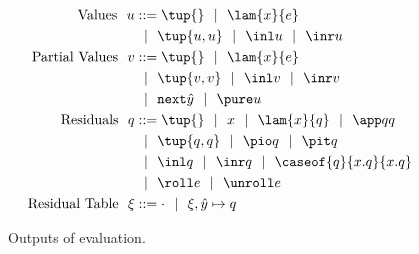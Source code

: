 
\begin{figure}
\begin{abstrsyn}
\[\begin{aligned}
\text{Values}\ \ 
u &::= \tup{}
 \gbar \lam {\var}{e} \\
&\gbar \tup{u, u}
 \gbar \inl u 
 \gbar \inr u \\
\text{Partial Values}\ \ 
v &::= \tup{}
 \gbar \lam {\var}{\expr} \\
&\gbar \tup{v, v}
 \gbar \inl v 
 \gbar \inr v \\
&\gbar \next {\hat y}
 \gbar \pure u \\
\text{Residuals}\ \ 
q &::= \tup{}\gbar\var%
 \gbar \lam {\var}{q} 
 \gbar \app q q \\
&\gbar \tup{q, q} 
 \gbar \pio q 
 \gbar \pit q \\
&\gbar \inl q 
 \gbar \inr q
 \gbar \caseof {q}{\var.q}{\var.q} \\
&\gbar \roll e
 \gbar \unroll e\\
\text{Residual Table}\ \ 
\xi &::= \cdot
 \gbar \xi, {\hat y} \mapsto q \\
\end{aligned}\]
\end{abstrsyn}
\caption{Outputs of evaluation.}
\label{fig:values}
\end{figure}



